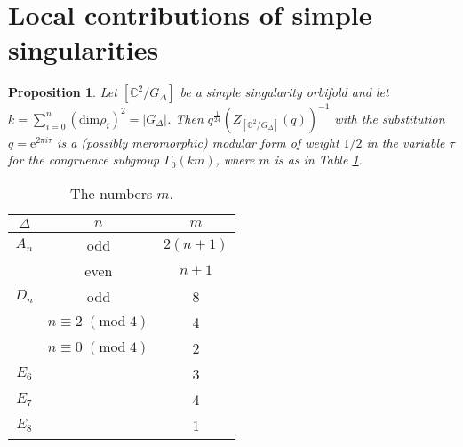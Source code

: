 \documentclass[11pt,a4paper]{amsart}
\newtheorem{proposition}[theorem]{Proposition}
\theoremstyle{definition}
\newcommand{\SC}{\mathbb{C}}                    %
\begin{document}
\section{Local contributions of simple singularities}
\label{sec:loccontr}


\begin{proposition}
\label{prop:locmod}
 Let $[\SC^2/G_\Delta]$ be a simple singularity orbifold and let $k=\sum_{i=0}^n (\mathrm{dim} \rho_i)^2=|G_\Delta|$. Then $q^{\frac{1}{24}}(Z_{[\SC^2/G_\Delta]}(q))^{-1}$ with the substitution $q=\mathrm{e}^{2 \pi i \tau}$ is a (possibly meromorphic) modular form of weight $1/2$ in the variable $\tau$ for the congruence subgroup $\Gamma_0(km)$, where  $m$ is as in Table \ref{table:congorder}.
\end{proposition}


\begin{table}
	\begin{tabular}{ |c|c|c| }
		\hline
		$\Delta$ & $n$ & $m$ \\
		\hline
		$A_n$ & odd & $2(n+1)$ \\
		& even & $n+1$ \\
		$D_n$ & odd & 8 \\
		& $n \equiv 2\;(\mathrm{mod}\;4)$ & 4 \\
		& $n \equiv 0\;(\mathrm{mod}\;4)$ & 2 \\
		$E_6$ & & 3 \\
		$E_7$ & & 4 \\
		$E_8$ & & 1 \\
		\hline
	\end{tabular}
	\vspace{0.2in}
	\caption{The numbers $m$.}
	\label{table:congorder}
\end{table}
\end{document}
